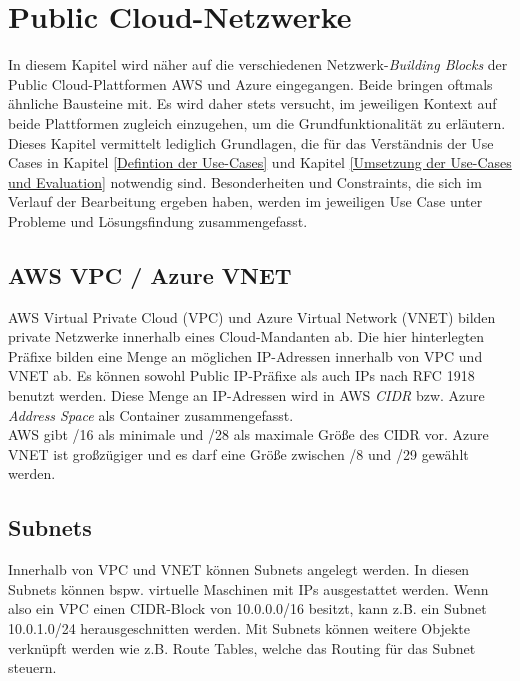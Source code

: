 \section{Public Cloud-Netzwerke}\label{public-cloud-networking}
In diesem Kapitel wird näher auf die verschiedenen Netzwerk-\textit{Building Blocks} der Public Cloud-Plattformen AWS und Azure eingegangen. Beide bringen oftmals ähnliche Bausteine mit. Es wird daher stets versucht, im jeweiligen Kontext auf beide Plattformen zugleich einzugehen, um die Grundfunktionalität zu erläutern.\\
Dieses Kapitel vermittelt lediglich Grundlagen, die für das Verständnis der Use Cases in Kapitel \ref{Defintion der Use-Cases} und Kapitel \ref{Umsetzung der Use-Cases und Evaluation} notwendig sind. Besonderheiten und Constraints, die sich im Verlauf der Bearbeitung ergeben haben, werden im jeweiligen Use Case unter \glqq Probleme und Lösungsfindung\grqq{} zusammengefasst.

\subsection{AWS VPC / Azure VNET}
AWS Virtual Private Cloud (VPC) und Azure Virtual Network (VNET) bilden private Netzwerke innerhalb eines Cloud-Mandanten ab. Die hier hinterlegten Präfixe bilden eine Menge an möglichen IP-Adressen innerhalb von \gls{VPC} und \gls{VNET} ab. Es können sowohl Public IP-Präfixe als auch IPs nach \gls{RFC} 1918 benutzt werden. Diese Menge an IP-Adressen wird in AWS \textit{\gls{CIDR}} bzw. Azure \textit{Address Space} als Container zusammengefasst.\\
AWS gibt /16 als minimale und /28 als maximale Größe des \gls{CIDR} vor\cite[S.100]{awsug2020}. Azure \gls{VNET} ist großzügiger und es darf eine Größe zwischen /8 und /29 gewählt werden\cite[S.10]{Toroman2019}. 
\subsection{Subnets}
Innerhalb von \gls{VPC} und \gls{VNET} können Subnets angelegt werden. In diesen Subnets können bspw. virtuelle Maschinen mit IPs ausgestattet werden. Wenn also ein \gls{VPC} einen \gls{CIDR}-Block von 10.0.0.0/16 besitzt, kann z.B. ein Subnet 10.0.1.0/24 \glqq herausgeschnitten\grqq{} werden. Mit Subnets können weitere Objekte verknüpft werden wie z.B. Route Tables, welche das Routing für das Subnet steuern.

